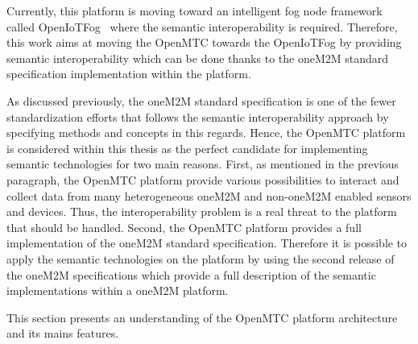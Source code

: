 Currently, this platform is moving toward an intelligent fog node framework called OpenIoTFog~\cite{openiotfog} where the semantic interoperability is required. Therefore, this work aims at moving the OpenMTC towards the OpenIoTFog by providing semantic interoperability which can be done thanks to the oneM2M standard specification implementation within the platform. \par 
As discussed previously, the oneM2M standard specification is one of the fewer standardization efforts that follows the semantic interoperability approach by specifying methods and concepts in this regards. Hence, the OpenMTC platform is considered within this thesis as the perfect candidate for implementing semantic technologies for two main reasons. First, as mentioned in the previous paragraph, the OpenMTC platform provide various possibilities to interact and collect data from many heterogeneous oneM2M and non-oneM2M enabled sensors and devices. Thus, the interoperability problem is a real threat to the platform that should be handled. Second, the OpenMTC platform provides a full implementation of the oneM2M standard specification. Therefore it is possible to apply the semantic technologies on the platform by using the second release of the oneM2M specifications which provide a full description of the semantic implementations within a oneM2M platform. \par
This section presents an understanding of the OpenMTC platform architecture and its mains features.

